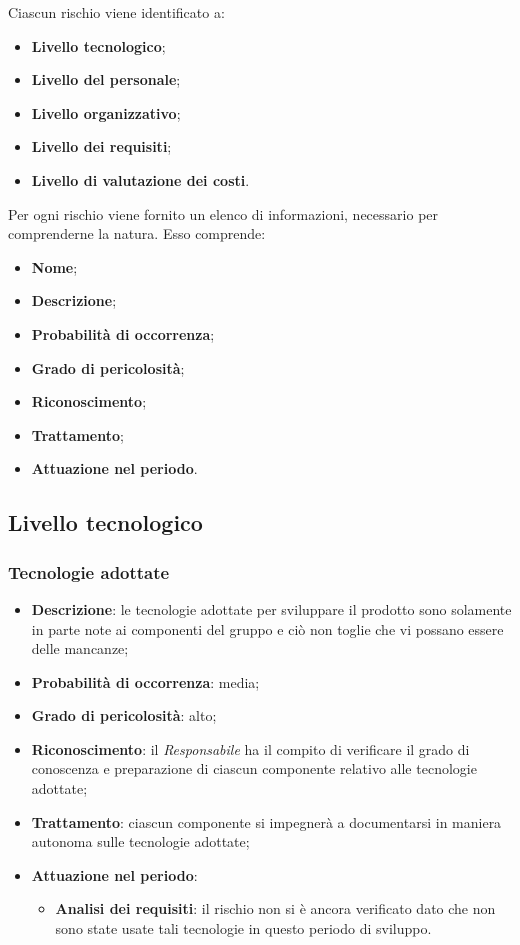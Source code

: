 Ciascun rischio viene identificato a:
\begin{itemize}
	\item \textbf{Livello tecnologico};
	\item \textbf{Livello del personale};
	\item \textbf{Livello organizzativo};
	\item \textbf{Livello dei requisiti};
	\item \textbf{Livello di valutazione dei costi}.
\end{itemize}
Per ogni rischio viene fornito un elenco di informazioni, necessario per comprenderne la natura. Esso comprende:
\begin{itemize}
	\item \textbf{Nome};
	\item \textbf{Descrizione};
	\item \textbf{Probabilità di occorrenza};
	\item \textbf{Grado di pericolosità};
	\item \textbf{Riconoscimento};
	\item \textbf{Trattamento};
	\item \textbf{Attuazione nel periodo}.
\end{itemize}
	\subsection{Livello tecnologico}
		\subsubsection{Tecnologie adottate}
		\begin{itemize}
			\item \textbf{Descrizione}: le tecnologie adottate per sviluppare il prodotto sono solamente in parte note ai componenti del gruppo e ciò non toglie che vi possano essere delle mancanze;
			\item \textbf{Probabilità di occorrenza}: media;
			\item \textbf{Grado di pericolosità}: alto;
			\item \textbf{Riconoscimento}: il \emph{Responsabile} ha il compito di verificare il grado di conoscenza e preparazione di ciascun componente relativo alle tecnologie adottate;
			\item \textbf{Trattamento}: ciascun componente si impegnerà a documentarsi in maniera autonoma sulle tecnologie adottate;
			\item \textbf{Attuazione nel periodo}:
			\begin{itemize}
				\item \textbf{Analisi dei requisiti}: il rischio non si è ancora verificato dato che non sono state usate tali tecnologie in questo periodo di sviluppo.
			\end{itemize}
		\end{itemize}
